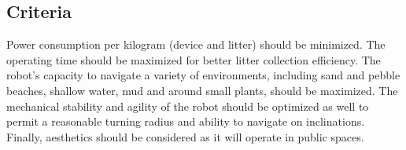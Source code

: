 \subsection{Criteria}

Power consumption per kilogram (device and litter) should be minimized.
The operating time should be maximized for better litter collection efficiency.
The robot's capacity to navigate a variety of environments, including sand and pebble beaches, shallow water, mud and around small plants, should be maximized.
The mechanical stability and agility of the robot should be optimized as well to permit a reasonable turning radius and ability to navigate on inclinations.
Finally, aesthetics should be considered as it will operate in public spaces.

\begin{comment}
The following criteria were selected as guides to optimize the design. First, the power consumption per kilogram (device and litter) is to be minimized. Additionally, the operating time of the device is to be maximized for more waste collecting efficiency. 
More specifically to the above required operating terrains, the ability to operate on sandy and pebble beaches as well as shallow water, mud and small plants (foot design, mechanical stability) should be optimized. The range of mobility of the device, such as turning and operating on slopes, is also to be optimized.
Lastly, as the device will operate in public areas, the aesthetic appeal is to be considered.
\end{comment}
